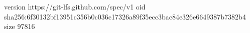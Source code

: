 version https://git-lfs.github.com/spec/v1
oid sha256:6f30132bf13951c356b0c036c17326a89f35ecc3bac84e326e6649387b7382b4
size 97816
